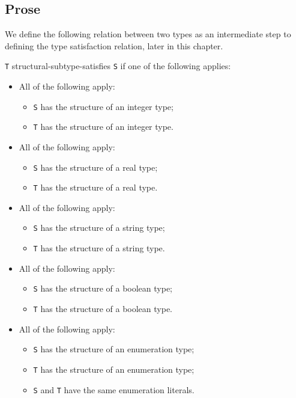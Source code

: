 \documentclass{book}
\begin{document}
\subsection{Prose}
We define the following relation between two types as an intermediate step to defining the type satisfaction relation, later in this chapter.

  \texttt{T} structural-subtype-satisfies \texttt{S} if one of the following applies:
  \begin{itemize}
  \item All of the following apply:
    \begin{itemize}
    \item \texttt{S} has the structure of an integer type;
    \item \texttt{T} has the structure of an integer type.
    \end{itemize}

  \item All of the following apply:
    \begin{itemize}
    \item \texttt{S} has the structure of a real type;
    \item \texttt{T} has the structure of a real type.
    \end{itemize}

  \item All of the following apply:
    \begin{itemize}
    \item \texttt{S} has the structure of a string type;
    \item \texttt{T} has the structure of a string type.
    \end{itemize}

  \item All of the following apply:
    \begin{itemize}
    \item \texttt{S} has the structure of a boolean type;
    \item \texttt{T} has the structure of a boolean type.
    \end{itemize}

  \item All of the following apply:
    \begin{itemize}
    \item \texttt{S} has the structure of an enumeration type;
    \item \texttt{T} has the structure of an enumeration type;
    \item \texttt{S} and \texttt{T} have the same enumeration literals.
    \end{itemize}


\end{itemize}
\end{document}
